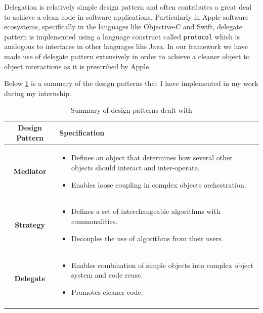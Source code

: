 \begin{itemize}
	\par Delegation is relatively simple design pattern and often contributes a great deal to achieve a clean code in software applications. Particularly in Apple software ecosystems, specifically in the languages like Objective-C and Swift, delegate pattern is implemented using a language construct called \texttt{protocol} \cite{wikidelegation} which is analogous to interfaces in other languages like Java. In our framework we have made use of delegate pattern extensively in order to achieve a cleaner object to object interactions as it is prescribed by Apple.
\end{itemize}
Below \ref{table:design_patterns} is a summary of the design patterns that I have implemented in my work during my internship.

\begin{longtable}{|| c | p{} |} 
	\hline
	\textbf{Design Pattern} & \textbf{Specification} \\ \hline
	\textbf{Mediator} & 
	\begin{itemize}
		\item Defines an object that determines how several other objects should interact and inter-operate.
		\item Enables loose coupling in complex objects orchestration.
	\end{itemize}
	\\ \hline
	\textbf{Strategy} &
	\begin{itemize}
		\item Defines a set of interchangeable algorithms with commonalities.
		\item Decouples the use of algorithms from their users.
	\end{itemize}
	\\ \hline
	\textbf{Delegate} & 
	\begin{itemize}
		\item Enables combination of simple objects into complex object system and code reuse.
		\item Promotes cleaner code.
	\end{itemize}
	\\ \hline
	\caption{Summary of design patterns dealt with \cite{gamma1995design}}
	\label{table:design_patterns}
\end{longtable}

